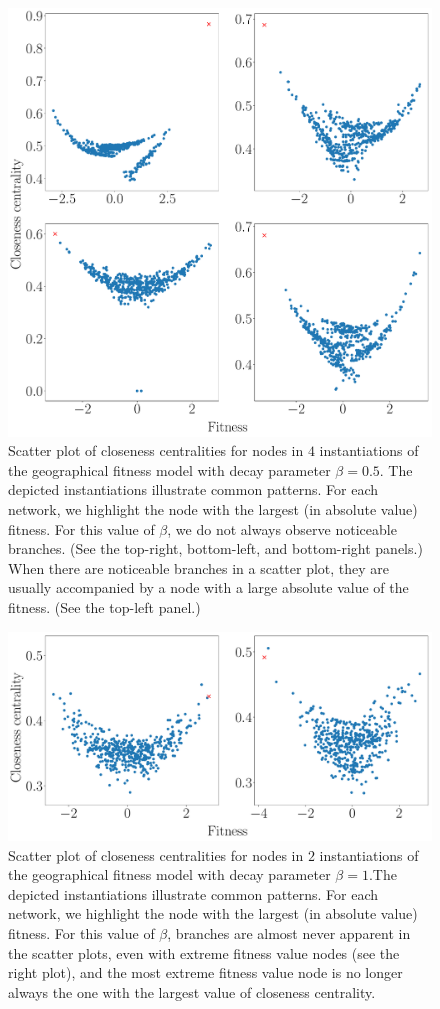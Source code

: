 \documentclass[%
 reprint,
 amsmath,amssymb,
 aps,
]{revtex4-1}
\begin{document}
 

\begin{figure}
    \centering
    \includegraphics[width=0.8\linewidth]{geographic_beta_05_examples_largerfont.pdf}
    \caption{Scatter plot of closeness centralities for nodes in $4$ instantiations of the geographical fitness model with decay parameter $\beta = 0.5$. The depicted instantiations illustrate common patterns. For each network, we highlight the node with the largest (in absolute value) fitness. For this value of $\beta$, we do not always observe noticeable branches. (See the top-right, bottom-left, and bottom-right panels.) When there are noticeable branches in a scatter plot, they are usually accompanied by a node with a large absolute value of the fitness. (See the top-left panel.)
    }
    \label{fig:closeness_example_2}
\end{figure}


\begin{figure}
    \centering
    \includegraphics[width=0.8\linewidth]{geographic_beta_10_examples_largerfont.pdf}
    \caption{Scatter plot of closeness centralities for nodes in $2$ instantiations of the geographical fitness model with decay parameter $\beta = 1$.The depicted instantiations illustrate common patterns. For each network, we highlight the node with the largest (in absolute value) fitness. For this value of $\beta$, branches are almost never apparent in the scatter plots, even with extreme fitness value nodes (see the right plot), and the most extreme fitness value node is no longer always the one with the largest value of closeness centrality.
    }
    \label{fig:closeness_example_3}
\end{figure}
\end{document}
